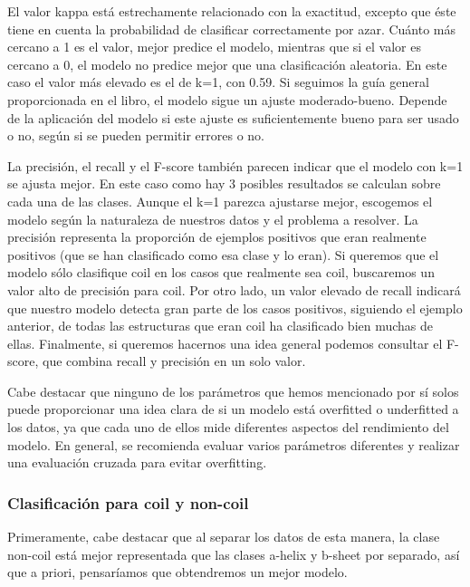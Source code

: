 \documentclass[
]{article}
\begin{document}
El valor kappa está estrechamente relacionado con la exactitud, excepto
que éste tiene en cuenta la probabilidad de clasificar correctamente por
azar. Cuánto más cercano a 1 es el valor, mejor predice el modelo,
mientras que si el valor es cercano a 0, el modelo no predice mejor que
una clasificación aleatoria. En este caso el valor más elevado es el de
k=1, con 0.59. Si seguimos la guía general proporcionada en el libro, el
modelo sigue un ajuste moderado-bueno. Depende de la aplicación del
modelo si este ajuste es suficientemente bueno para ser usado o no,
según si se pueden permitir errores o no.

La precisión, el recall y el F-score también parecen indicar que el
modelo con k=1 se ajusta mejor. En este caso como hay 3 posibles
resultados se calculan sobre cada una de las clases. Aunque el k=1
parezca ajustarse mejor, escogemos el modelo según la naturaleza de
nuestros datos y el problema a resolver. La precisión representa la
proporción de ejemplos positivos que eran realmente positivos (que se
han clasificado como esa clase y lo eran). Si queremos que el modelo
sólo clasifique coil en los casos que realmente sea coil, buscaremos un
valor alto de precisión para coil. Por otro lado, un valor elevado de
recall indicará que nuestro modelo detecta gran parte de los casos
positivos, siguiendo el ejemplo anterior, de todas las estructuras que
eran coil ha clasificado bien muchas de ellas. Finalmente, si queremos
hacernos una idea general podemos consultar el F-score, que combina
recall y precisión en un solo valor.

Cabe destacar que ninguno de los parámetros que hemos mencionado por sí
solos puede proporcionar una idea clara de si un modelo está overfitted
o underfitted a los datos, ya que cada uno de ellos mide diferentes
aspectos del rendimiento del modelo. En general, se recomienda evaluar
varios parámetros diferentes y realizar una evaluación cruzada para
evitar overfitting.

\hypertarget{clasificaciuxf3n-para-coil-y-non-coil}{%
\subsubsection{Clasificación para coil y
non-coil}\label{clasificaciuxf3n-para-coil-y-non-coil}}

Primeramente, cabe destacar que al separar los datos de esta manera, la
clase non-coil está mejor representada que las clases a-helix y b-sheet
por separado, así que a priori, pensaríamos que obtendremos un mejor
modelo.
\end{document}
